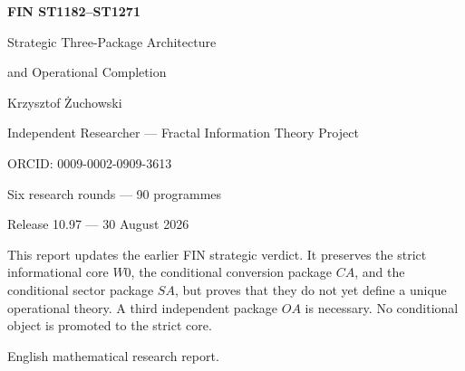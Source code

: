 \documentclass[11pt,a4paper]{article}
\begin{document}
\begin{titlepage}\centering\vspace*{15mm}
{\Huge\bfseries FIN ST1182--ST1271\par}\vspace{5mm}
{\LARGE Strategic Three-Package Architecture\par}\vspace{2mm}
{\LARGE and Operational Completion\par}\vspace{13mm}
{\Large Krzysztof \.Zuchowski\par}
{\normalsize Independent Researcher --- Fractal Information Theory Project\par}
{\normalsize ORCID: 0009-0002-0909-3613\par}\vspace{10mm}
{\large Six research rounds --- 90 programmes\par}
{\large Release 10.97 --- 30 August 2026\par}
\vfill
\begin{minipage}{.87\textwidth}\small
This report updates the earlier FIN strategic verdict.  It preserves the strict
informational core $W0$, the conditional conversion package $CA$, and the
conditional sector package $SA$, but proves that they do not yet define a
unique operational theory.  A third independent package $OA$ is necessary.
No conditional object is promoted to the strict core.
\end{minipage}\vfill
{\small English mathematical research report.}
\end{titlepage}
\end{document}
